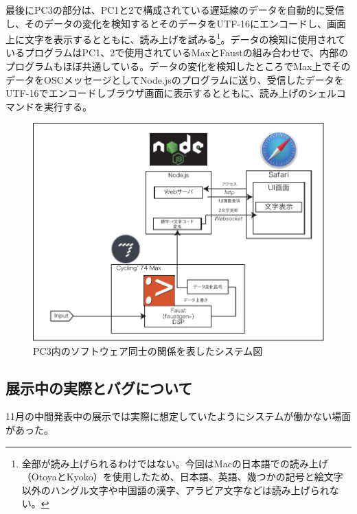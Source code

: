 \documentclass[a4paper,report]{jsbook}
\begin{document}
最後にPC3の部分は、PC1と2で構成されている遅延線のデータを自動的に受信し、そのデータの変化を検知するとそのデータをUTF-16にエンコードし、画面上に文字を表示するとともに、読み上げを試みる\footnote{全部が読み上げられるわけではない。今回はMacの日本語での読み上げ（OtoyaとKyoko）を使用したため、日本語、英語、幾つかの記号と絵文字以外のハングル文字や中国語の漢字、アラビア文字などは読み上げられない。}。データの検知に使用されているプログラムはPC1、2で使用されているMaxとFaustの組み合わせで、内部のプログラムもほぼ共通している。データの変化を検知したところでMax上でそのデータをOSCメッセージとしてNode.jsのプログラムに送り、受信したデータをUTF-16でエンコードしブラウザ画面に表示するとともに、読み上げのシェルコマンドを実行する。

\begin{no-prefix-figure-caption}

\begin{figure}[htbp]
\centering
\includegraphics[width=1.00000\textwidth]{./img/qam2speech_diagram.pdf}
\caption{PC3内のソフトウェア同士の関係を表したシステム図}
\end{figure}

\end{no-prefix-figure-caption}

\subsection{展示中の実際とバグについて}\label{ux5c55ux793aux4e2dux306eux5b9fux969bux3068ux30d0ux30b0ux306bux3064ux3044ux3066}

11月の中間発表中の展示では実際に想定していたようにシステムが働かない場面があった。
\end{document}
